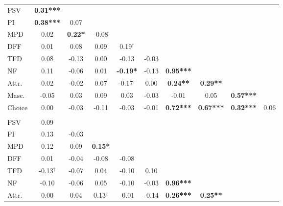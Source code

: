 \documentclass[
  bookmarksnumbered]{article}
\begin{document}
\begin{table}[H]
{\begin{threeparttable}
\begin{tabular}[t]{lccccccccc}
\hline
\hspace{1em}PSV & \textbf{0.31***} &  &  &  &  &  &  &  & \\
\hspace{1em}PI & \textbf{0.38***} & 0.07 &  &  &  &  &  &  & \\
\hspace{1em}MPD & 0.02 & \textbf{0.22*} & -0.08 &  &  &  &  &  & \\
\hspace{1em}DFF & 0.01 & 0.08 & 0.09 & 0.19$^{\dagger}$ &  &  &  &  & \\
\hspace{1em}TFD & 0.08 & -0.13 & 0.00 & -0.13 & -0.03 &  &  &  & \\
\hspace{1em}NF & 0.11 & -0.06 & 0.01 & \textbf{-0.19*} & -0.13 & \textbf{0.95***} &  &  & \\
\hspace{1em}Attr. & 0.02 & -0.02 & 0.07 & -0.17$^{\dagger}$ & 0.00 & \textbf{0.24**} & \textbf{0.29**} &  & \\
\hspace{1em}Masc. & -0.05 & 0.03 & 0.09 & 0.03 & -0.03 & -0.01 & 0.05 & \textbf{0.57***} & \\
\hspace{1em}Choice & 0.00 & -0.03 & -0.11 & -0.03 & -0.01 & \textbf{0.72***} & \textbf{0.67***} & \textbf{0.32***} & 0.06\\
\addlinespace[0.3em]
\hline
\multicolumn{10}{l}{\textbf{High condition, short-term relationship}}\\
\hline
\hspace{1em}PSV & 0.09 &  &  &  &  &  &  &  \vphantom{1} & \\
\hspace{1em}PI & 0.13 & -0.03 &  &  &  &  &  &  \vphantom{1} & \\
\hspace{1em}MPD & 0.12 & 0.09 & \textbf{0.15*} &  &  &  &  &  \vphantom{1} & \\
\hspace{1em}DFF & 0.01 & -0.04 & -0.08 & -0.08 &  &  &  &  & \\
\hspace{1em}TFD & -0.13$^{\dagger}$ & -0.07 & 0.04 & -0.10 & 0.10 &  &  &  & \\
\hspace{1em}NF & -0.10 & -0.06 & 0.05 & -0.10 & -0.03 & \textbf{0.96***} &  &  & \\
\hspace{1em}Attr. & 0.00 & 0.04 & 0.13$^{\dagger}$ & -0.01 & -0.14 & \textbf{0.26***} & \textbf{0.25**} &  & \\

\end{tabular}
\end{threeparttable}}
\end{table}
\end{document}
